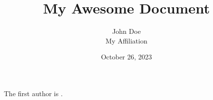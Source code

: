 \documentclass{article}
\title{My Awesome Document}
\author{John Doe \\ \small My Affiliation}
\date{October 26, 2023}
\begin{document}

The first author is \theauthor.
\maketitle
\end{document}
